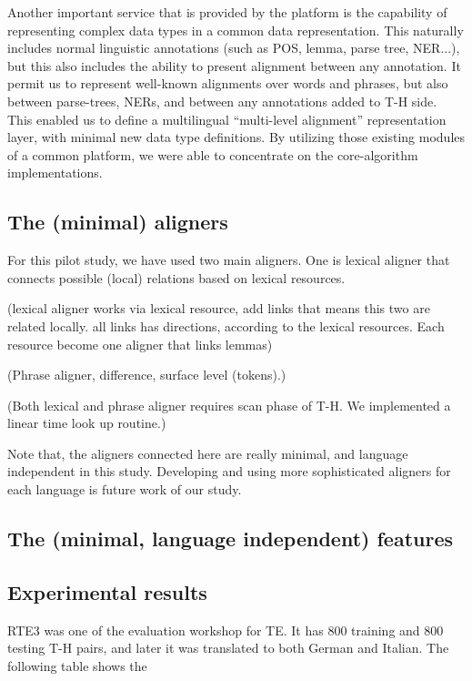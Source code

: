 \documentclass[11pt,letterpaper]{article}
\begin{document}
Another important service that is provided by the platform is the
capability of representing complex data types in a common data
representation. This naturally includes normal linguistic annotations
(such as POS, lemma, parse tree, NER...), but this also includes the
ability to present alignment between any annotation. It permit us to
represent well-known alignments over words and phrases, but also
between parse-trees, NERs, and between any annotations added to T-H
side. This enabled us to define a multilingual ``multi-level
alignment''  representation layer, with minimal new data type
definitions.
By utilizing those existing modules of a common platform, we were able
to concentrate on the core-algorithm implementations.   

\subsection{The (minimal) aligners}
For this pilot study, we have used two main aligners. One is lexical
aligner that connects possible (local) relations based on lexical
resources.

(lexical aligner works via lexical resource, add links that means this
two are related locally. all links has directions, according to the
lexical resources. Each resource become one aligner that links lemmas)

(Phrase aligner, difference, surface level (tokens).)  

(Both lexical and phrase aligner requires scan phase of T-H. We
implemented a linear time look up routine.)

Note that, the aligners connected here are really minimal, and
language independent in this study. Developing and using more
sophisticated aligners for each language is future work of our study.

\subsection{The (minimal, language independent) features} 



\subsection{Experimental results} 
RTE3 was one of the evaluation workshop for TE. It has 800 training
and 800 testing T-H pairs, and later it was translated to both German
and Italian. The following table shows the 
\end{document}
